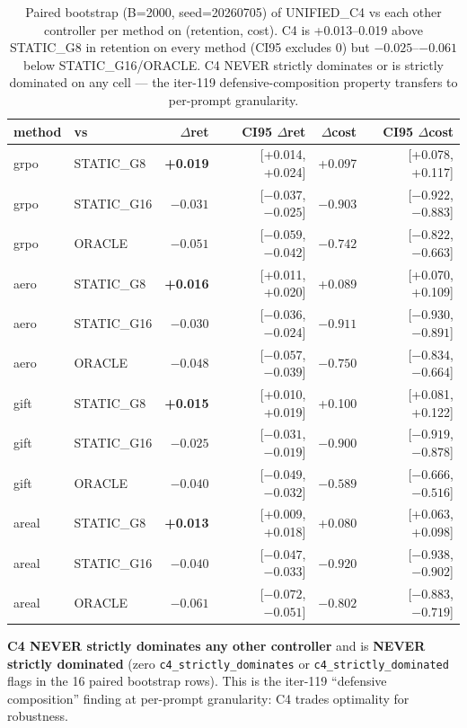 \documentclass{article}
\begin{document}
\begin{table}[ht]
\centering
\small
\begin{tabular}{llrrrr}
\toprule
method & vs & $\Delta$ret & CI95 $\Delta$ret & $\Delta$cost & CI95 $\Delta$cost \\
\midrule
grpo  & STATIC\_G8 & \textbf{+0.019} & [+0.014, +0.024] & +0.097 & [+0.078, +0.117] \\
grpo  & STATIC\_G16 & $-0.031$ & [$-0.037$, $-0.025$] & $-0.903$ & [$-0.922$, $-0.883$] \\
grpo  & ORACLE & $-0.051$ & [$-0.059$, $-0.042$] & $-0.742$ & [$-0.822$, $-0.663$] \\
aero  & STATIC\_G8 & \textbf{+0.016} & [+0.011, +0.020] & +0.089 & [+0.070, +0.109] \\
aero  & STATIC\_G16 & $-0.030$ & [$-0.036$, $-0.024$] & $-0.911$ & [$-0.930$, $-0.891$] \\
aero  & ORACLE & $-0.048$ & [$-0.057$, $-0.039$] & $-0.750$ & [$-0.834$, $-0.664$] \\
gift  & STATIC\_G8 & \textbf{+0.015} & [+0.010, +0.019] & +0.100 & [+0.081, +0.122] \\
gift  & STATIC\_G16 & $-0.025$ & [$-0.031$, $-0.019$] & $-0.900$ & [$-0.919$, $-0.878$] \\
gift  & ORACLE & $-0.040$ & [$-0.049$, $-0.032$] & $-0.589$ & [$-0.666$, $-0.516$] \\
areal & STATIC\_G8 & \textbf{+0.013} & [+0.009, +0.018] & +0.080 & [+0.063, +0.098] \\
areal & STATIC\_G16 & $-0.040$ & [$-0.047$, $-0.033$] & $-0.920$ & [$-0.938$, $-0.902$] \\
areal & ORACLE & $-0.061$ & [$-0.072$, $-0.051$] & $-0.802$ & [$-0.883$, $-0.719$] \\
\bottomrule
\end{tabular}
\caption{Paired bootstrap (B=2000, seed=20260705) of UNIFIED\_C4 vs each
other controller per method on (retention, cost). C4 is +0.013--0.019 above
STATIC\_G8 in retention on every method (CI95 excludes 0) but $-0.025$--$-0.061$
below STATIC\_G16/ORACLE. C4 NEVER strictly dominates or is strictly dominated
on any cell --- the iter-119 defensive-composition property transfers to
per-prompt granularity.}
\label{tab:p7-iter159-paired-c4}
\end{table}

\textbf{C4 NEVER strictly dominates any other controller} and is
\textbf{NEVER strictly dominated} (zero \texttt{c4\_strictly\_dominates} or
\texttt{c4\_strictly\_dominated} flags in the 16 paired bootstrap rows).
This is the iter-119 ``defensive composition'' finding at per-prompt
granularity: C4 trades optimality for robustness.
\end{document}

